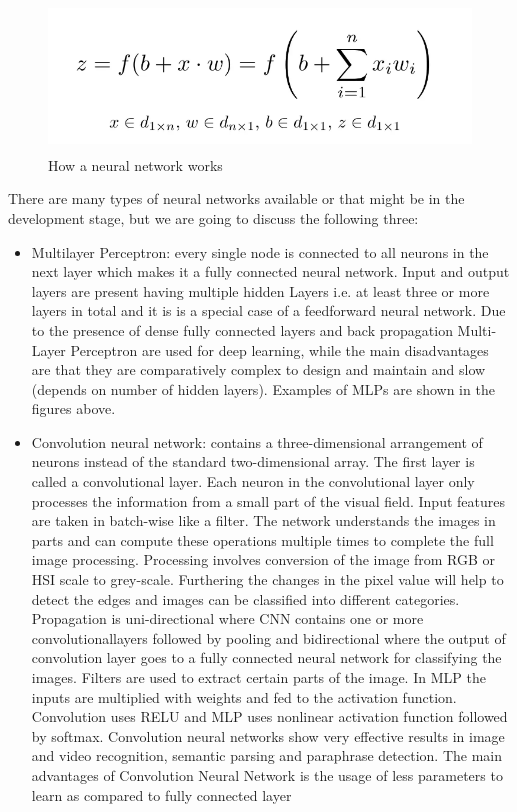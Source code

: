 \documentclass{article}
\begin{document}
 \begin{figure}[H]
\centering
\includegraphics[height=40mm]{images/ann-formula.png}
\caption{\label{fig:correlation}How a neural network works }
\label{6}
\end{figure}
\noindent
There are many types of neural networks available or that might be in the development stage, but we are going to discuss the following three:
\begin{itemize}
 \setlength\itemsep{-0.3em}
\item Multilayer Perceptron:
every single node is connected to all neurons in the next layer which makes it a fully connected neural network. Input and output layers are present having multiple hidden Layers i.e. at least three or more layers in total and it is  is a special case of a feedforward neural network.
Due to the presence of dense fully connected layers and back propagation Multi-Layer Perceptron are used for deep learning, while the main disadvantages are that they are comparatively complex to design and maintain and slow (depends on number of hidden layers).
Examples of MLPs are shown in the figures above.

\item Convolution neural network: contains a three-dimensional arrangement of neurons instead of the standard two-dimensional array. The first layer is called a convolutional layer. Each neuron in the convolutional layer only processes the information from a small part of the visual field. Input features are taken in batch-wise like a filter. The network understands the images in parts and can compute these operations multiple times to complete the full image processing. Processing involves conversion of the image from RGB or HSI scale to grey-scale. Furthering the changes in the pixel value will help to detect the edges and images can be classified into different categories.
Propagation is uni-directional where CNN contains one or more convolutionallayers followed by pooling and bidirectional where the output of convolution layer goes to a fully connected neural network for classifying the images. Filters are used to extract certain parts of the image. In MLP the inputs are multiplied with weights and fed to the activation function. Convolution uses RELU and MLP uses nonlinear activation function followed by softmax. Convolution neural networks show very effective results in image and video recognition, semantic parsing and paraphrase detection.
The main advantages of Convolution Neural Network is the usage of less parameters to learn as compared to fully connected layer


\end{itemize}
\end{document}

